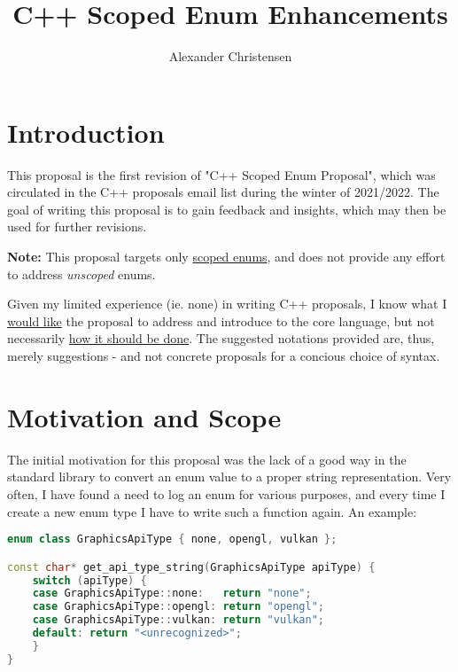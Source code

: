 \documentclass[
  format=manuscript,
  screen=true,
  review=false,
  nonacm=true,
  timestamp=true,
  balance=false]{acmart}
\author{Alexander Christensen}
\title{C++ Scoped Enum Enhancements}
\begin{document}

\maketitle
\tableofcontents

\section{Introduction}

This proposal is the first revision of "C++ Scoped Enum Proposal", which was circulated
in the C++ proposals email list during the winter of 2021/2022. The goal of writing
this proposal is to gain feedback and insights, which may then be used for further
revisions.

\noindent
\textbf{Note:} This proposal targets only \underline{scoped enums}, and does not provide any
effort to address \textit{unscoped} enums.

\vspace{2mm}\noindent
Given my limited experience (ie. none) in writing C++ proposals, I know what I
\underline{would like} the proposal to address and introduce to the core language,
but not necessarily \underline{how it should be done}. The suggested notations
provided are, thus, merely suggestions - and not concrete proposals for a concious
choice of syntax.


\section{Motivation and Scope}

The initial motivation for this proposal was the lack of a good way in the standard
library to convert an enum value to a proper string representation. Very often, I
have found a need to log an enum for various purposes, and every time I create a new
enum type I have to write such a function again. An example:\vspace{2mm}

\begin{lstlisting}[language=Cpp]
enum class GraphicsApiType { none, opengl, vulkan };

const char* get_api_type_string(GraphicsApiType apiType) {
    switch (apiType) {
    case GraphicsApiType::none:   return "none";
    case GraphicsApiType::opengl: return "opengl";
    case GraphicsApiType::vulkan: return "vulkan";
    default: return "<unrecognized>";
    }
}
\end{lstlisting}
\end{document}

